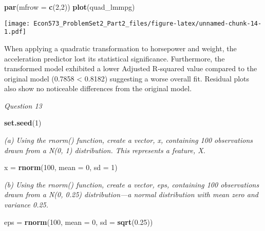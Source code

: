 \documentclass[
]{article}
\newenvironment{Shaded}{\begin{snugshade}}{\end{snugshade}}
\newcommand{\AttributeTok}[1]{\textcolor[rgb]{0.13,0.29,0.53}{#1}}
\newcommand{\DecValTok}[1]{\textcolor[rgb]{0.00,0.00,0.81}{#1}}
\newcommand{\FloatTok}[1]{\textcolor[rgb]{0.00,0.00,0.81}{#1}}
\newcommand{\FunctionTok}[1]{\textcolor[rgb]{0.13,0.29,0.53}{\textbf{#1}}}
\newcommand{\NormalTok}[1]{#1}
\newcommand{\OtherTok}[1]{\textcolor[rgb]{0.56,0.35,0.01}{#1}}
\begin{document}
\begin{Shaded}
\begin{Highlighting}[]
\FunctionTok{par}\NormalTok{(}\AttributeTok{mfrow =} \FunctionTok{c}\NormalTok{(}\DecValTok{2}\NormalTok{,}\DecValTok{2}\NormalTok{))}
\FunctionTok{plot}\NormalTok{(quad\_lmmpg)}
\end{Highlighting}
\end{Shaded}

\texttt{[image: Econ573\_ProblemSet2\_Part2\_files/figure-latex/unnamed-chunk-14-1.pdf]}

When applying a quadratic transformation to horsepower and weight, the
acceleration predictor lost its statistical significance. Furthermore,
the transformed model exhibited a lower Adjusted R-squared value
compared to the original model (0.7858 \textless{} 0.8182) suggesting a
worse overall fit. Residual plots also show no noticeable differences
from the original model.

\emph{Question 13}

\begin{Shaded}
\begin{Highlighting}[]
\FunctionTok{set.seed}\NormalTok{(}\DecValTok{1}\NormalTok{)}
\end{Highlighting}
\end{Shaded}

\emph{(a) Using the rnorm() function, create a vector, x, containing 100
observations drawn from a N(0, 1) distribution. This represents a
feature, X. }

\begin{Shaded}
\begin{Highlighting}[]
\NormalTok{x }\OtherTok{=} \FunctionTok{rnorm}\NormalTok{(}\DecValTok{100}\NormalTok{, }\AttributeTok{mean =} \DecValTok{0}\NormalTok{, }\AttributeTok{sd =} \DecValTok{1}\NormalTok{)}
\end{Highlighting}
\end{Shaded}

\emph{(b) Using the rnorm() function, create a vector, eps, containing
100 observations drawn from a N(0, 0.25) distribution---a normal
distribution with mean zero and variance 0.25. }

\begin{Shaded}
\begin{Highlighting}[]
\NormalTok{eps }\OtherTok{=} \FunctionTok{rnorm}\NormalTok{(}\DecValTok{100}\NormalTok{, }\AttributeTok{mean =} \DecValTok{0}\NormalTok{, }\AttributeTok{sd =} \FunctionTok{sqrt}\NormalTok{(}\FloatTok{0.25}\NormalTok{))}
\end{Highlighting}
\end{Shaded}
\end{document}

